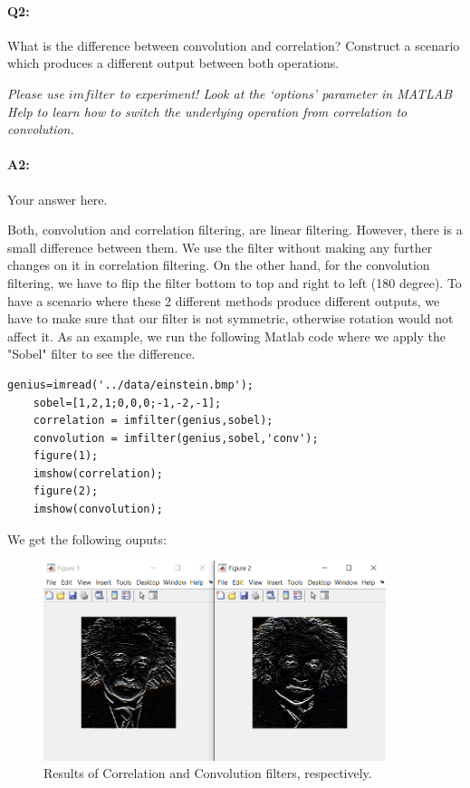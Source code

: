 	
	
	\pagebreak
	\paragraph{Q2:} What is the difference between convolution and correlation? Construct a scenario which produces a different output between both operations.
	
	\emph{Please use \href{https://www.mathworks.com/help/images/ref/imfilter.html}{$imfilter$} to experiment! Look at the `options' parameter in MATLAB Help to learn how to switch the underlying operation from correlation to convolution.}
	
	\paragraph{A2:} Your answer here.
	
	Both, convolution and correlation filtering, are linear filtering. However, there is a small difference between them. We use the filter without making any further changes on it in correlation filtering. On the other hand, for the convolution filtering, we have to flip the filter bottom to top and right  to left (180 degree). To have a scenario where these 2 different methods produce different outputs, we have to make sure that our filter is not symmetric, otherwise rotation would not affect it. As an example, we run the following Matlab code where we apply the "Sobel" filter to see the difference.
	
	\begin{lstlisting}[style=Matlab-editor]
    genius=imread('../data/einstein.bmp');
    sobel=[1,2,1;0,0,0;-1,-2,-1];
    correlation = imfilter(genius,sobel);
    convolution = imfilter(genius,sobel,'conv');
    figure(1);
    imshow(correlation);
    figure(2);
    imshow(convolution);
    \end{lstlisting}
	
	We get the following ouputs:
	
	\begin{figure}[htp]
    \centering
    \includegraphics[width=10cm]{questions/EinsteinResult.PNG}
    \caption{Results of Correlation and Convolution filters, respectively.}
    \label{fig:einstein}
    \end{figure}
	
